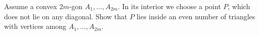 Assume a convex $2m$-gon $A_1, \ldots, A_{2m}$. In its interior we choose a point $P$, which does not lie on any diagonal. Show that $P$ lies inside an even number of triangles with vertices among $A_1, \ldots, A_{2m}$.
